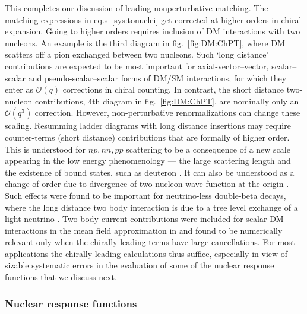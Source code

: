 This completes our discussion of leading nonperturbative matching. The matching expressions in eq.s~\eqref{sys:tonuclei} get corrected at higher orders in chiral expansion. 
Going to higher orders requires inclusion of DM interactions with two nucleons. 
An example is the third diagram in fig.~\ref{fig:DM:ChPT}, where DM scatters off a pion exchanged between two nucleons. Such `long distance' contributions are expected to be most important for axial-vector--vector, scalar--scalar and pseudo-scalar--scalar forms of DM/SM interactions,  
for which they enter as ${\mathcal O}(q)$ corrections in chiral counting. In contrast,  the short distance two-nucleon contributions, 4th diagram in fig.~\ref{fig:DM:ChPT}, 
are nominally only an ${\mathcal O}(q^3)$ correction. 
However, non-perturbative renormalizations can change these scaling. Resumming ladder diagrams with long distance insertions may require counter-terms (short distance) contributions that are formally of higher order. This is understood for $np, nn, pp$ scattering to be a consequence of a new scale appearing in the low energy phenomenology --- the large scattering length and the existence of bound states, such as deuteron \cite{Chiral-EFT}. It can also be understood as a change of order due to divergence  of two-nucleon wave function at the origin \cite{PavonValderrama:2014zeq}. Such effects were found to be important for neutrino-less double-beta decays, where the long distance two body interaction is due to a tree level exchange of a light neutrino \cite{Chiral-EFT-0beta}. Two-body current contributions were included for scalar DM interactions in the mean field approximation in \cite{2body:currents:DM:scattering} and found to be numerically relevant only when the chirally leading terms have large cancellations. For most applications the chirally leading calculations thus suffice, especially in view of sizable systematic errors in the evaluation of some of the nuclear response functions that we discuss next. 



\subsubsection{Nuclear response functions} 

